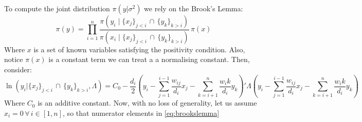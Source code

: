 \documentclass{article}
\begin{document}
To compute the joint distribution $\pi(y|\sigma^2)$ we rely on the Brook's Lemma:
 \begin{equation}
 \pi(y) = \prod_{i=1}^n \frac{
 \pi \left(y_i \mid \lbrace x_j \rbrace_{j<i} \, \cap \, \lbrace y_k \rbrace_{k>i}  \right)
 }{
 \pi \left(x_i \mid \lbrace x_j \rbrace_{j<i} \, \cap \, \lbrace y_k \rbrace_{k>i}  \right)
 } \, \pi(x)
 \label{eq:brookslemma}
 \end{equation}
Where $x$ is a set of known variables satisfying the positivity condition. Also, notice  $\pi(x)$ is a constant term we can treat a a normalising constant. Then, consider:
$$
\ln \left(y_i | \lbrace x_j \rbrace_{j<i} \, \cap \, \lbrace y_k \rbrace_{k>i}, \Lambda  \right) =
C_0 - \frac{d_i}{2} \left( 
y_i - \sum_{j=1}^{i-1} \frac{w_{ij}}{d_i} x_j  - \sum_{k=i+1}^{n} \frac{w_ik}{d_i}y_k
\right)' \Lambda \left( 
y_i - \sum_{j=1}^{i-1} \frac{w_{ij}}{d_i} x_j  - \sum_{k=i+1}^{n} \frac{w_ik}{d_i}y_k
\right)
$$ Where $C_0$ is an additive constant. Now, with no loss of generality, let us assume $x_i = 0 \,   \forall \, i \in [1,n]$, so that numerator elements in \ref{eq:brookslemma}
 
\end{document}
